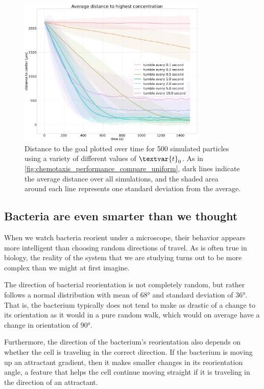 \begin{figure}[h]
\centering
\mySfFamily
\includegraphics[width = 0.8\textwidth]{../images/chemotaxis_performance_uniform.png}
\caption{Distance to the goal plotted over time for 500 simulated particles using a variety of different values of $\textvar{t}_\text{0}$. As in \autoref{fig:chemotaxis_performance_compare_uniform}, dark lines indicate the average distance over all simulations, and the shaded area around each line represents one standard deviation from the average.}
\label{fig:chemotaxis_performance_uniform}
\end{figure}

\subsection{Bacteria are even smarter than we thought}

When we watch bacteria reorient under a microscope, their behavior appears more intelligent than choosing random directions of travel. As is often true in biology, the reality of the system that we are studying turns out to be more complex than we might at first imagine.

The direction of bacterial reorientation is not completely random, but rather follows a normal distribution with mean of 68° and standard deviation of 36°. That is, the bacterium typically does not tend to make as drastic of a change to its orientation as it would in a pure random walk, which would on average have a change in orientation of 90°.

Furthermore, the direction of the bacterium's reorientation also depends on whether the cell is traveling in the correct direction. If the bacterium is moving up an attractant gradient, then it makes smaller changes in its reorientation angle, a feature that helps the cell continue moving straight if it is traveling in the direction of an attractant.

